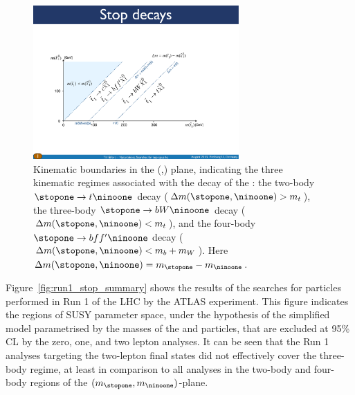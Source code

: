 \begin{figure}[!htb]
    \begin{center}
        \includegraphics[width=0.7\textwidth]{figures/search_stop2l/signal/stop_LSP_boundaries}
        \caption{
            Kinematic boundaries in the (\stopone,\ninoone) plane, indicating the three kinematic
            regimes associated with the decay of the \stopone: the two-body $\stopone \rightarrow t \ninoone$
            decay ($\Delta m(\stopone, \ninoone) > m_t$), the three-body $\stopone \rightarrow b W \ninoone$ decay
            ($\Delta m(\stopone, \ninoone) < m_t$), and the four-body $\stopone \rightarrow b f f^{\prime} \ninoone$
            decay ($\Delta m(\stopone, \ninoone) < m_b + m_W$).
            Here $\Delta m(\stopone, \ninoone) = m_{\stopone} - m_{\ninoone}$.
        }
        \label{fig:stop_boundaries}
    \end{center}
\end{figure}

Figure~\ref{fig:run1_stop_summary} shows the results of the searches for \stopone particles performed
in Run 1 of the LHC by the ATLAS experiment.
This figure indicates the regions of SUSY parameter space, under the hypothesis of the
simplified model parametrised by the masses of the \stopone and \ninoone particles,
that are excluded at 95\% CL by the zero, one, and two lepton analyses.
It can be seen that the Run 1 analyses targeting the two-lepton final states did not effectively
cover the three-body regime, at least in comparison to all analyses in the two-body and four-body regions
of the $(m_{\stopone}, m_{\ninoone})$-plane.


